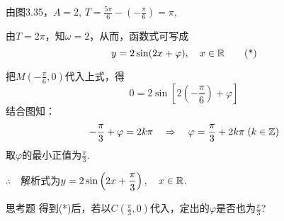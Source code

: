 \begin{solution}
由图3.35，$A=2$, $T=\frac{5\pi}{6}-\left(-\frac{\pi}{6}\right)=\pi$, 

由$T=2\pi$，知$\omega=2$，从而，函数式可写成
\begin{equation}
   y=2\sin(2x+\varphi),\quad x\in\mathbb{R} \tag{*} 
\end{equation}

    把$M\left(-\frac{\pi}{6},0\right)$代入上式，得
\[0=2\sin\left[2\left(-\frac{\pi}{6}\right)+\varphi\right]\]
    结合图知：
\[-\dfrac{\pi}{3}+\varphi=2k\pi \quad \Rightarrow\quad \varphi=\dfrac{\pi}{3}+2k\pi\; (k\in\mathbb{Z})\]
取$\varphi$的最小正值为$\frac{\pi}{3}$.

$\therefore\quad $解析式为$y=2\sin\left(2x+\dfrac{\pi}{3}\right),\quad x\in\mathbb{R}$.
\end{solution}

\begin{thm}{思考题}
得到(*)后，若以$C\left(\frac{\pi}{3},0\right)$代入，定出的$\varphi$是否也为$\frac{\pi}{3}$?
\end{thm}

